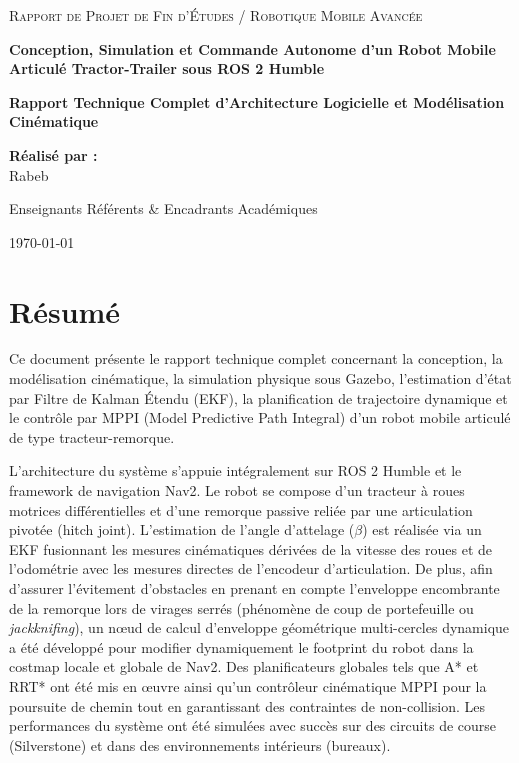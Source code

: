 \documentclass[12pt,a4paper,openany]{report}
\begin{document}
\begin{titlepage}
    \centering
    \vspace*{1.5cm}
    {\scshape\Large Rapport de Projet de Fin d'Études / Robotique Mobile Avancée\par}
    \vspace{1.5cm}
    {\huge\bfseries Conception, Simulation et Commande Autonome d'un Robot Mobile Articulé Tractor-Trailer sous ROS 2 Humble\par}
    \vspace{1cm}
    {\large\bfseries Rapport Technique Complet d'Architecture Logicielle et Modélisation Cinématique\par}
    \vspace{2cm}
    {\large\textbf{Réalisé par :}\\ Rabeb\par}
    \vspace{1.5cm}
    \vfill
    {\large Enseignants Référents \& Encadrants Académiques\par}
    \vfill
    {\large\today\par}
\end{titlepage}

\chapter*{Résumé}
Ce document présente le rapport technique complet concernant la conception, la modélisation cinématique, la simulation physique sous Gazebo, l'estimation d'état par Filtre de Kalman Étendu (EKF), la planification de trajectoire dynamique et le contrôle par MPPI (Model Predictive Path Integral) d'un robot mobile articulé de type tracteur-remorque. 

L'architecture du système s'appuie intégralement sur ROS 2 Humble et le framework de navigation Nav2. Le robot se compose d'un tracteur à roues motrices différentielles et d'une remorque passive reliée par une articulation pivotée (hitch joint). L'estimation de l'angle d'attelage ($\beta$) est réalisée via un EKF fusionnant les mesures cinématiques dérivées de la vitesse des roues et de l'odométrie avec les mesures directes de l'encodeur d'articulation. De plus, afin d'assurer l'évitement d'obstacles en prenant en compte l'enveloppe encombrante de la remorque lors de virages serrés (phénomène de coup de portefeuille ou \textit{jackknifing}), un nœud de calcul d'enveloppe géométrique multi-cercles dynamique a été développé pour modifier dynamiquement le footprint du robot dans la costmap locale et globale de Nav2. Des planificateurs globales tels que A* et RRT* ont été mis en œuvre ainsi qu'un contrôleur cinématique MPPI pour la poursuite de chemin tout en garantissant des contraintes de non-collision. Les performances du système ont été simulées avec succès sur des circuits de course (Silverstone) et dans des environnements intérieurs (bureaux).
\end{document}
